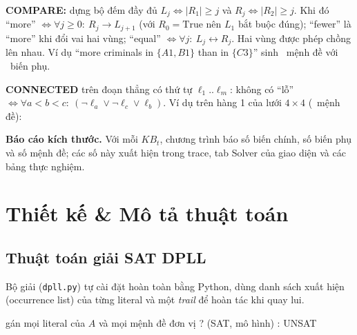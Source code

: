 \documentclass{article}
\newcommand{\code}[1]{\texttt{#1}}
\newcommand{\KB}{\mathit{KB}}
\begin{document}
\textbf{COMPARE:} dựng bộ đếm đầy đủ $L_j \iff |R_1| \ge j$ và $R_j \iff |R_2| \ge j$. Khi đó ``more'' $\iff \forall j \ge 0:\ R_j \to L_{j+1}$ (với $R_0 = \text{True}$ nên $L_1$ bắt buộc đúng); ``fewer'' là ``more'' khi đổi vai hai vùng; ``equal'' $\iff \forall j:\ L_j \leftrightarrow R_j$. Hai vùng được phép chồng lên nhau. Ví dụ ``more criminals in $\{A1,B1\}$ than in $\{C3\}$'' sinh \ExCompareN\ mệnh đề với \ExCompareAux\ biến phụ.

\textbf{CONNECTED} trên đoạn thẳng có thứ tự $\ell_1..\ell_m$: không có ``lỗ'' $\iff \forall a<b<c:\ (\neg\ell_a \lor \neg\ell_c \lor \ell_b)$. Ví dụ trên hàng 1 của lưới $4\times4$ (\ExConnectedN\ mệnh đề): \ExConnected

\textbf{Báo cáo kích thước.} Với mỗi $\KB_t$, chương trình báo số biến chính, số biến phụ và số mệnh đề; các số này xuất hiện trong trace, tab Solver của giao diện và các bảng thực nghiệm.

\section{Thiết kế \& Mô tả thuật toán}

\subsection{Thuật toán giải SAT DPLL}
Bộ giải (\code{dpll.py}) tự cài đặt hoàn toàn bằng Python, dùng danh sách xuất hiện (occurrence list) của từng literal và một \textit{trail} để hoàn tác khi quay lui.

\begin{algorithm}[H]
\caption{DPLL với assumption}
gán mọi literal của $A$ và mọi mệnh đề đơn vị
\Return \Search{} ? (SAT, mô hình) : UNSAT\;
\BlankLine
{}
\end{algorithm}
\end{document}
